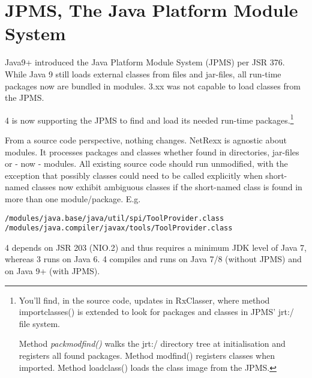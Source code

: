 \chapter{JPMS, The Java Platform Module System}
Java9+ introduced the Java Platform Module System (JPMS) per JSR 376.
While Java 9 still loads external classes from files and jar-files, all
run-time packages now are bundled in modules.
\nr{} 3.xx was not capable to load classes from the JPMS.

\nr{} 4 is now supporting the JPMS to find and load its needed run-time
packages.\footnote{You'll find, in the \nr{} source code, updates in RxClasser, where method importclasses() is extended to look
for packages and classes in JPMS' jrt:/ file system.

Method \emph{packmodfind()} walks the jrt:/ directory tree at initialisation and
registers all found packages. Method modfind() registers classes when imported.
Method loadclass() loads the class image from the JPMS.}

From a \nr{} source code perspective, nothing changes. NetRexx is agnostic
about modules. It processes packages and classes whether found in directories,
jar-files or - now - modules.
All existing source code should run unmodified, with the exception that possibly
classes could need to be called explicitly when short-named classes now
exhibit ambiguous classes if the short-named class is found in more than one
module/package.
E.g.
\begin{verbatim}
/modules/java.base/java/util/spi/ToolProvider.class
/modules/java.compiler/javax/tools/ToolProvider.class
\end{verbatim}

\nr{} 4 depends on JSR 203 (NIO.2) and thus requires a minimum JDK level of Java 7,
whereas \nr{} 3 runs on Java 6.
\nr{} 4 compiles and runs on Java 7/8 (without JPMS) and on Java 9+ (with JPMS).

